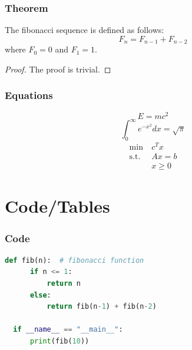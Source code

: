 \documentclass{cls/simplebeamer}
\begin{document}
\begin{frame}
  \frametitle{Theorem}
  \begin{theorem}
    The fibonacci sequence is defined as follows:
    \begin{equation}
      F_n = F_{n-1} + F_{n-2}
    \end{equation}
    where $F_0 = 0$ and $F_1 = 1$.
  \end{theorem}
  \begin{proof}
    The proof is trivial.
  \end{proof}
\end{frame}

\begin{frame}
  \frametitle{Equations}
  
  \begin{equation}
    E = mc^2
  \end{equation}
  \begin{equation}
    \int_0^\infty e^{-x^2} dx = \sqrt{\pi}
  \end{equation}
  \vspace{12pt}
  \begin{equation}
    \begin{aligned}
      \min~ & c^T x \\
      \text{s.t. } & Ax = b\\
      & x \geq 0 
    \end{aligned}
  \end{equation}
\end{frame}

\section{Code/Tables}


\begin{frame}[fragile]
  \frametitle{Code}
  \begin{lstlisting}[language=Python]
  def fib(n):  # fibonacci function
      if n <= 1:
          return n
      else:
          return fib(n-1) + fib(n-2)

  if __name__ == "__main__":
      print(fib(10))
  \end{lstlisting}
\end{frame}
\end{document}
